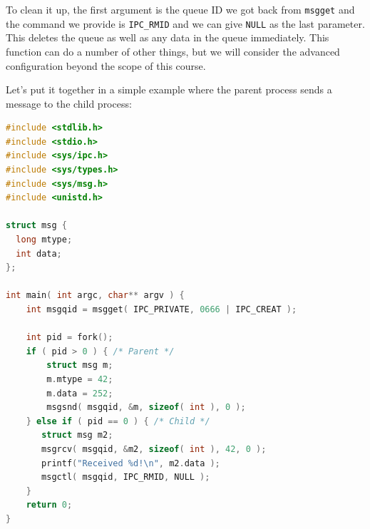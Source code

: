 To clean it up, the first argument is the queue ID we got back from \texttt{msgget} and the command we provide is \texttt{IPC\_RMID} and we can give \texttt{NULL} as the last parameter. This deletes the queue as well as any data in the queue immediately. This function can do a number of other things, but we will consider the advanced configuration beyond the scope of this course.

Let's put it together in a simple example where the parent process sends a message to the child process:
\begin{lstlisting}[language=C]
#include <stdlib.h>
#include <stdio.h>
#include <sys/ipc.h>
#include <sys/types.h>
#include <sys/msg.h>
#include <unistd.h>

struct msg {
  long mtype;
  int data;
};

int main( int argc, char** argv ) { 
    int msgqid = msgget( IPC_PRIVATE, 0666 | IPC_CREAT );

    int pid = fork();
    if ( pid > 0 ) { /* Parent */
        struct msg m;
        m.mtype = 42; 
        m.data = 252;
        msgsnd( msgqid, &m, sizeof( int ), 0 );
    } else if ( pid == 0 ) { /* Child */
       struct msg m2; 
       msgrcv( msgqid, &m2, sizeof( int ), 42, 0 );
       printf("Received %d!\n", m2.data );
       msgctl( msgqid, IPC_RMID, NULL );
    }   
    return 0;
}
\end{lstlisting}



